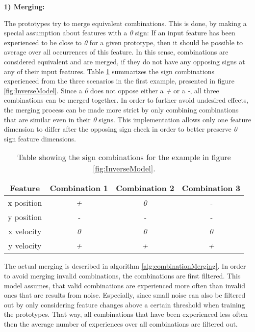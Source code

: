 \textbf{1) Merging:}

The prototypes try to merge equivalent combinations. This is done, by making a special assumption about features with a \textit{0} sign: If an input feature has been experienced to be close to \textit{0} for a given prototype, then it should be possible to average over all occurrences of this feature. 
In this sense, combinations are considered equivalent and are merged, if they do not have any opposing signs at any of their input features.
Table \ref{tab:signCombinations2} summarizes the sign combinations experienced from the three scenarios in the first example, presented in figure \ref{fig:InverseModel}.
Since a \textit{0} does not oppose either a \textit{+} or a \textit{-}, all three combinations can be merged together.
In order to further avoid undesired effects, the merging process can be made more strict by only combining combinations that are similar even in their \textit{0} signs. This implementation allows only one feature dimension to differ after the opposing sign check in order to better preserve \textit{0} sign feature dimensions.

\begin{table}
	\centering
	\begin{tabular}{|c|c|c|c|}
		\hline Feature & Combination 1 & Combination 2 & Combination 3 \\ 
		\hline x position & \textit{+} & \textit{0} & \textit{-} \\ 
		\hline y position & \textit{-} & \textit{-} & \textit{-} \\ 
		\hline x velocity & \textit{0} & \textit{0} & \textit{0} \\
		\hline y velocity & \textit{+} & \textit{+} & \textit{+} \\ 
		\hline 
	\end{tabular} 
	\caption{Table showing the sign combinations for the example in figure \ref{fig:InverseModel}.}
	\label{tab:signCombinations2}
\end{table}

The actual merging is described in algorithm \ref{alg:combinationMerging}. In order to avoid merging invalid combinations, the combinations are first filtered. This model assumes, that valid combinations are experienced more often than invalid ones that are results from noise. 
Especially, since small noise can also be filtered out by only considering feature changes above a certain threshold when training the prototypes. That way, all combinations that have been experienced less often then the average number of experiences over all combinations are filtered out. %

